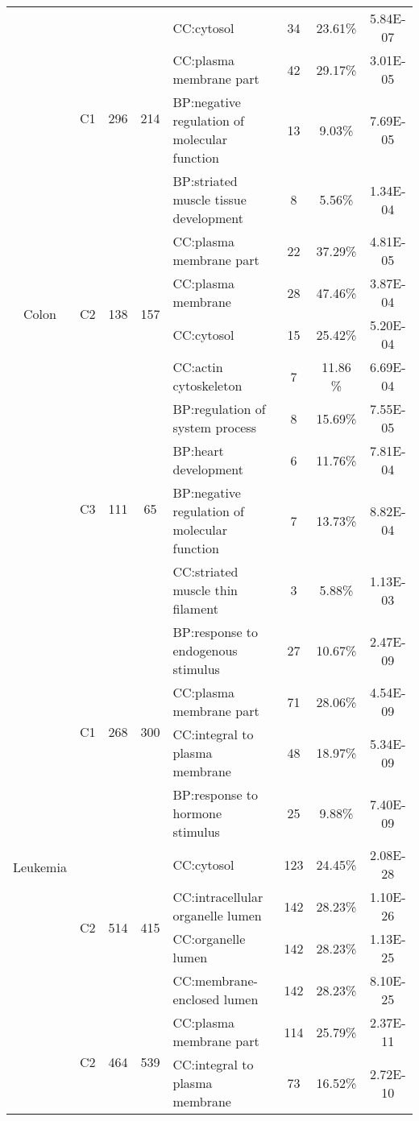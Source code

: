 \begin{table*}[!htb]
\begin{tabular}{c|c|cclccc}
\multirow{12}{*}{Colon} &\multirow{4}{*}{C1}& \multirow{4}{*}{296} &\multirow{4}{*}{214}& CC:cytosol                &34  & 23.61\%   & 5.84E-07\\
&&&&CC:plasma membrane part    &42  & 29.17\%    &3.01E-05\\
&&&&BP:negative regulation of molecular function          &13  &9.03\%     &7.69E-05\\
&&&& BP:striated muscle tissue development          &8  &5.56\%     &1.34E-04\\
\cline{2-8}
 &\multirow{4}{*}{C2}& \multirow{4}{*}{138} &\multirow{4}{*}{157}& CC:plasma membrane part & 22 &37.29\%& 4.81E-05\\
&&&& CC:plasma membrane& 28 &47.46\%&3.87E-04\\
&&&& CC:cytosol &15&25.42\%&5.20E-04\\
&&&& CC:actin cytoskeleton &7 & 11.86 \%&6.69E-04\\  \cline{2-8}
 &\multirow{4}{*}{C3}& \multirow{4}{*}{111} &\multirow{4}{*}{65}& BP:regulation of system process & 8 &15.69\%& 7.55E-05\\
&&&& BP:heart development & 6 & 11.76\% &7.81E-04\\
&&&& BP:negative regulation of molecular function& 7 & 13.73\%& 8.82E-04\\
&&&& CC:striated muscle thin filament & 3 &5.88\% & 1.13E-03 \\
\hline
\multirow{12}{*}{Leukemia} &\multirow{4}{*}{C1}& \multirow{4}{*}{268} &\multirow{4}{*}{300}
&BP:response to endogenous stimulus & 27 & 10.67\% & 2.47E-09\\
&&&&CC:plasma membrane part & 71 & 28.06\% & 4.54E-09\\
&&&&CC:integral to plasma membrane & 48 & 18.97\% & 5.34E-09\\
&&&&BP:response to hormone stimulus & 25 & 9.88\% & 7.40E-09\\
\cline{2-8}
&\multirow{4}{*}{C2}& \multirow{4}{*}{514} &\multirow{4}{*}{415}
&CC:cytosol & 123 & 24.45\% & 2.08E-28\\
&&&&CC:intracellular organelle lumen & 142 & 28.23\% & 1.10E-26\\
&&&&CC:organelle lumen & 142 & 28.23\% & 1.13E-25\\
&&&&CC:membrane-enclosed lumen & 142 & 28.23\% & 8.10E-25\\
\cline{2-8}
&\multirow{4}{*}{C2}& \multirow{4}{*}{464} &\multirow{4}{*}{539}
&CC:plasma membrane part & 114 & 25.79\% & 2.37E-11\\
&&&&CC:integral to plasma membrane & 73 & 16.52\% & 2.72E-10\\

\end{tabular}
\end{table*}
